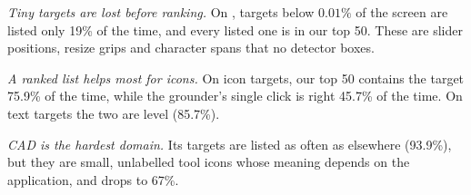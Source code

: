 \emph{Tiny targets are lost before ranking.} On \osw, targets below $0.01\%$ of the screen are listed only 19\% of
the time, and every listed one is in our top 50. These are slider positions, resize grips and character spans that
no detector boxes.

\emph{A ranked list helps most for icons.} On \sspro icon targets, our top 50 contains the target 75.9\% of the
time, while the grounder's single click is right 45.7\% of the time. On text targets the two are level (85.7\%).

\emph{CAD is the hardest domain.} Its targets are listed as often as elsewhere (93.9\%), but they are small,
unlabelled tool icons whose meaning depends on the application, and  drops to 67\%.

